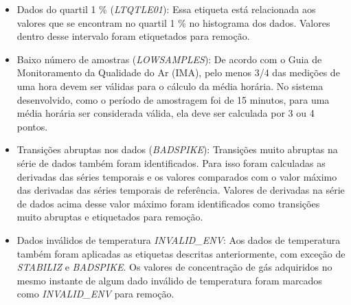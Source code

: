 \begin{itemize}
    \item Dados do quartil 1 \% (\textit{LTQTLE01}): Essa etiqueta está relacionada aos valores que se encontram no quartil 1 \% no histograma dos dados. Valores dentro desse intervalo foram etiquetados para remoção.
    \item Baixo número de amostras (\textit{LOWSAMPLES}): De acordo com o Guia de Monitoramento da Qualidade do Ar (IMA), pelo menos 3/4 das medições de uma hora devem ser válidas para o cálculo da média horária. No sistema desenvolvido, como o período de amostragem foi de 15 minutos, para uma média horária ser considerada válida, ela deve ser calculada por 3 ou 4 pontos.
    \item Transições abruptas nos dados (\textit{BADSPIKE}): Transições muito abruptas na série de dados também foram identificados. Para isso foram calculadas as derivadas das séries temporais e os valores comparados com o valor máximo das derivadas das séries temporais de referência. Valores de derivadas na série de dados acima desse valor máximo foram identificados como transições muito abruptas e etiquetados para remoção.
    \item Dados inválidos de temperatura \textit{INVALID\_ENV}: Aos dados de temperatura também foram aplicadas as etiquetas descritas anteriormente, com exceção de \textit{STABILIZ} e \textit{BADSPIKE}. Os valores de concentração de gás adquiridos no mesmo instante de algum dado inválido de temperatura foram marcados como \textit{INVALID\_ENV} para remoção.    
\end{itemize}